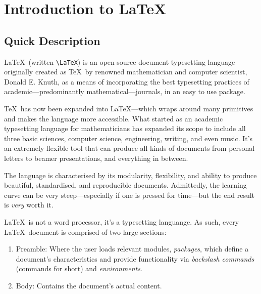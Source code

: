 \chapter{Introduction to \LaTeX}
%
\section{Quick Description}\label{s:qd}
\LaTeX~(written \verb|\LaTeX|) is an open-source document typesetting
language originally created as \TeX~by renowned mathematician and
computer scientist, Donald E. Knuth, as a means of incorporating the
best typesetting practices of academic---predominantly
mathematical---journals, in an easy to use package.

\TeX~has now been expanded into \LaTeX---which wraps around many
primitives and makes the language more accessible. What started as an
academic typesetting language for mathematicians has expanded its
scope to include all three basic sciences, computer science,
engineering, writing, and even music.  It's an extremely flexible tool
that can produce all kinds of documents from personal letters to
beamer presentations, and everything in between.

The language is characterised by its modularity, flexibility, and
ability to produce beautiful, standardised, and reproducible
documents.  Admittedly, the learning curve can be very
steep---especially if one is pressed for time---but the end result is
\emph{very} worth it.

\LaTeX~is not a word processor, it's a typesetting languange.  As
such, every \LaTeX~document is comprised of two large sections:
\begin{enumerate}
\item Preamble: Where the user loads relevant modules,
  \emph{packages}, which define a document's characteristics and
  provide functionality via \emph{backslash commands} (commands for
  short) and \emph{environments}.
\item Body: Contains the document's actual content.
\end{enumerate}
%
